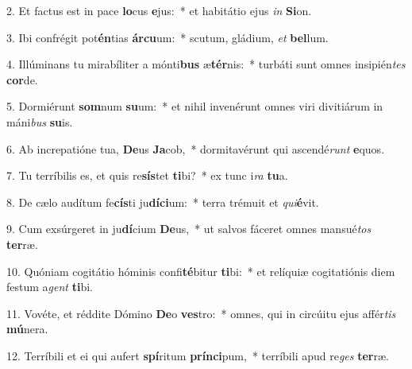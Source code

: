 2. Et factus est in pace \textbf{lo}cus \textbf{e}jus:~*  et habitátio ejus \textit{in} \textbf{Si}on.\

3. Ibi confrégit pot\textbf{én}tias \textbf{ár}\textbf{cu}um:~*  scutum, gládium, \textit{et} \textbf{bel}lum.\

4. Illúminans tu mirabíliter a mónti\textbf{bus} æ\textbf{tér}nis:~*  turbáti sunt omnes insipién\textit{tes} \textbf{cor}de.\

5. Dormiérunt \textbf{som}num \textbf{su}um:~*  et nihil invenérunt omnes viri divitiárum in máni\textit{bus} \textbf{su}is.\

6. Ab increpatióne tua, \textbf{De}us \textbf{Ja}cob,~*  dormitavérunt qui ascendé\textit{runt} \textbf{e}quos.\

7. Tu terríbilis es, et quis re\textbf{sís}tet \textbf{ti}bi?~*  ex tunc i\textit{ra} \textbf{tu}a.\

8. De cælo audítum fe\textbf{cís}ti ju\textbf{dí}\textbf{ci}um:~*  terra trémuit et \textit{qui}\textbf{é}vit.\

9. Cum exsúrgeret in ju\textbf{dí}cium \textbf{De}us,~*  ut salvos fáceret omnes mansué\textit{tos} \textbf{ter}ræ.\

10. Quóniam cogitátio hóminis confi\textbf{té}bitur \textbf{ti}bi:~*  et relíquiæ cogitatiónis diem festum a\textit{gent} \textbf{ti}bi.\

11. Vovéte, et réddite Dómino \textbf{De}o \textbf{ves}tro:~*  omnes, qui in circúitu ejus affér\textit{tis} \textbf{mú}nera.\

12. Terríbili et ei qui aufert \textbf{spí}ritum \textbf{prín}\textbf{ci}pum,~*  terríbili apud re\textit{ges} \textbf{ter}ræ.\


